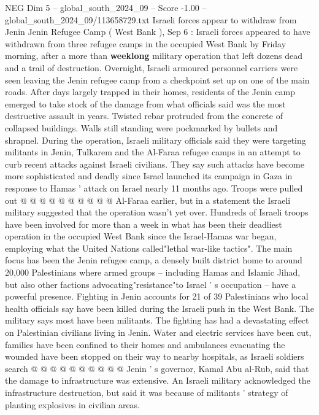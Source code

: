 \begin{textsample}{NEG Dim 5 – global\_south\_2024\_09 – Score -1.00 – global\_south\_2024\_09/113658729.txt}  \label{ex:f5_neg_195}
Israeli forces appear to withdraw from Jenin Jenin Refugee Camp ( West Bank ), Sep 6 : Israeli forces appeared to have withdrawn from three refugee camps in the occupied West Bank by Friday morning, after a more than \textbf{weeklong} military operation that left dozens dead and a trail of destruction.
Overnight, Israeli armoured personnel carriers were seen leaving the Jenin refugee camp from a checkpoint set up on one of the main roads.
After days largely trapped in their homes, residents of the Jenin camp emerged to take stock of the damage from what officials said was the most destructive assault in years.
Twisted rebar protruded from the concrete of collapsed buildings.
Walls still standing were pockmarked by bullets and shrapnel.
During the operation, Israeli military officials said they were targeting militants in Jenin, Tulkarem and the Al-Faraa refugee camps in an attempt to curb recent attacks against Israeli civilians.
They say such attacks have become more sophisticated and deadly since Israel launched its campaign in Gaza in response to Hamas ' attack on Israel nearly 11 months ago.
Troops were pulled out @ @ @ @ @ @ @ @ @ @ Al-Faraa earlier, but in a statement the Israeli military suggested that the operation wasn't yet over.
Hundreds of Israeli troops have been involved for more than a week in what has been their deadliest operation in the occupied West Bank since the Israel-Hamas war began, employing what the United Nations called"lethal war-like tactics".
The main focus has been the Jenin refugee camp, a densely built district home to around 20,000 Palestinians where armed groups -- including Hamas and Islamic Jihad, but also other factions advocating"resistance"to Israel ' s occupation -- have a powerful presence.
Fighting in Jenin accounts for 21 of 39 Palestinians who local health officials say have been killed during the Israeli push in the West Bank.
The military says most have been militants.
The fighting has had a devastating effect on Palestinian civilians living in Jenin.
Water and electric services have been cut, families have been confined to their homes and ambulances evacuating the wounded have been stopped on their way to nearby hospitals, as Israeli soldiers search @ @ @ @ @ @ @ @ @ @ Jenin ' s governor, Kamal Abu al-Rub, said that the damage to infrastructure was extensive.
An Israeli military acknowledged the infrastructure destruction, but said it was because of militants ' strategy of planting explosives in civilian areas.

\end{textsample}
